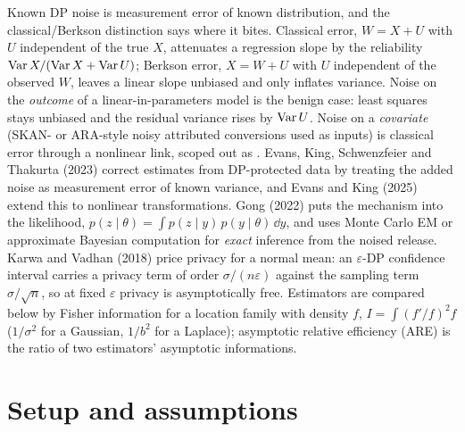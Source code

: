Known DP noise is measurement error of known distribution, and the classical/Berkson distinction says where it bites. Classical error, $W = X + U$ with $U$ independent of the true $X$, attenuates a regression slope by the reliability $\operatorname{Var} X/(\operatorname{Var} X + \operatorname{Var} U)$; Berkson error, $X = W + U$ with $U$ independent of the observed $W$, leaves a linear slope unbiased and only inflates variance. Noise on the \emph{outcome} of a linear-in-parameters model is the benign case: least squares stays unbiased and the residual variance rises by $\operatorname{Var} U$. Noise on a \emph{covariate} (SKAN- or ARA-style noisy attributed conversions used as inputs) is classical error through a nonlinear link, scoped out as . Evans, King, Schwenzfeier and Thakurta (2023) correct estimates from DP-protected data by treating the added noise as measurement error of known variance, and Evans and King (2025) extend this to nonlinear transformations. Gong (2022) puts the mechanism into the likelihood, $p(z\mid\theta) = \int p(z\mid y)\,p(y\mid\theta)\,\dd y$, and uses Monte Carlo EM or approximate Bayesian computation for \emph{exact} inference from the noised release. Karwa and Vadhan (2018) price privacy for a normal mean: an $\varepsilon$-DP confidence interval carries a privacy term of order $\sigma/(n\varepsilon)$ against the sampling term $\sigma/\sqrt{n}$, so at fixed $\varepsilon$ privacy is asymptotically free. Estimators are compared below by Fisher information for a location family with density $f$, $I = \int (f'/f)^2 f$ ($1/\sigma^2$ for a Gaussian, $1/b^2$ for a Laplace); asymptotic relative efficiency (ARE) is the ratio of two estimators' asymptotic informations.

\section{Setup and assumptions}

